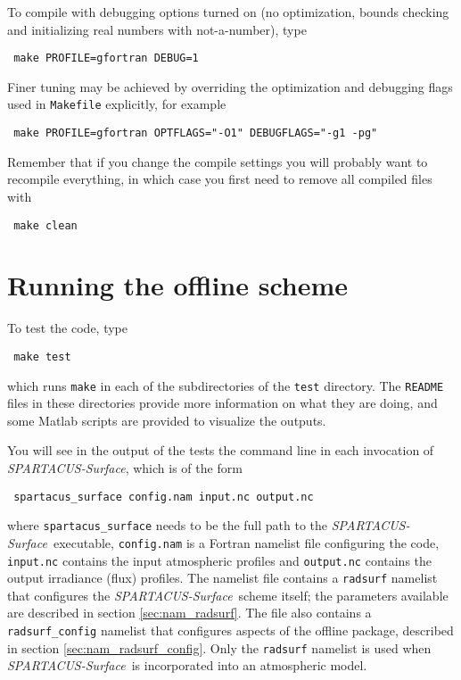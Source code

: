 \documentclass[a4,oneside]{article}
\def\codesize{\small}
\def\spsurf{\emph{SPARTACUS-Surface}}
\def\code#1{{\codesize\texttt{#1}}}
\begin{document}
To compile with debugging options turned on (no optimization, bounds
checking and initializing real numbers with not-a-number), type
\begin{lstlisting}
 make PROFILE=gfortran DEBUG=1
\end{lstlisting}
Finer tuning may be achieved by overriding the optimization and
debugging flags used in \code{Makefile} explicitly, for example
\begin{lstlisting}
 make PROFILE=gfortran OPTFLAGS="-O1" DEBUGFLAGS="-g1 -pg"
\end{lstlisting}
Remember that if you change the compile settings you will probably
want to recompile everything, in which case you first need to remove
all compiled files with
\begin{lstlisting}
 make clean
\end{lstlisting}

\section{Running the offline scheme}
\label{sec:run}
 To test the code, type
\begin{lstlisting}
 make test
\end{lstlisting}
which runs \code{make} in each of the subdirectories of the
\code{test} directory. The \code{README} files in these directories
provide more information on what they are doing, and some Matlab
scripts are provided to visualize the outputs.

You will see in the output of the tests the command line in each
invocation of \spsurf, which is of the form
%
\begin{lstlisting}
 spartacus_surface config.nam input.nc output.nc
\end{lstlisting}
where \code{spartacus\_surface} needs to be the full path to the
\spsurf\ executable, \code{config.nam} is a Fortran namelist file
configuring the code, \code{input.nc} contains the input atmospheric
profiles and \code{output.nc} contains the output irradiance (flux)
profiles.  The namelist file contains a \code{radsurf} namelist that
configures the \spsurf\ scheme itself; the parameters available are
described in section \ref{sec:nam_radsurf}. The file also contains a
\code{radsurf\_config} namelist that configures aspects of the offline
package, described in section \ref{sec:nam_radsurf_config}.  Only the
\code{radsurf} namelist is used when \spsurf\ is incorporated into an
atmospheric model.
\end{document}
